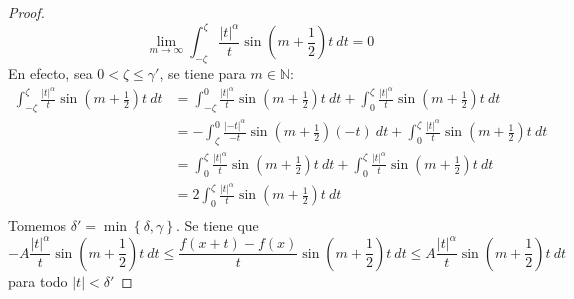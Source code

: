 \documentclass[12pt]{report}
\newcounter{it}
\theoremstyle{largebreak}
\renewcommand{\leq}{\ensuremath{\leqslant}}
\newcommand\abs[1]{\ensuremath{\left|#1\right|}}
\begin{document}
\begin{proof}
\begin{equation*}
            \lim_{ m\rightarrow\infty}\int_{-\zeta}^{\zeta}\frac{\abs{t}^\alpha}{t}\sin\left(m+\frac{1}{2}\right)t\:dt=0
        \end{equation*}
        En efecto, sea $0<\zeta\leq\gamma'$, se tiene para $m\in\mathbb{N}$:
        \begin{equation*}
            \begin{split}
                \int_{-\zeta}^{\zeta}\frac{\abs{t}^\alpha}{t}\sin\left(m+\frac{1}{2}\right)t\:dt&=\int_{-\zeta}^{0}\frac{\abs{t}^\alpha}{t}\sin\left(m+\frac{1}{2}\right)t\:dt+\int_{0}^{\zeta}\frac{\abs{t}^\alpha}{t}\sin\left(m+\frac{1}{2}\right)t\:dt\\
                &=-\int_{\zeta}^{0}\frac{\abs{-t}^\alpha}{-t}\sin\left(m+\frac{1}{2}\right)(-t)\:dt+\int_{0}^{\zeta}\frac{\abs{t}^\alpha}{t}\sin\left(m+\frac{1}{2}\right)t\:dt\\
                &=\int_{0}^{\zeta}\frac{\abs{t}^\alpha}{t}\sin\left(m+\frac{1}{2}\right)t\:dt+\int_{0}^{\zeta}\frac{\abs{t}^\alpha}{t}\sin\left(m+\frac{1}{2}\right)t\:dt\\
                &=2\int_{0}^{\zeta}\frac{\abs{t}^\alpha}{t}\sin\left(m+\frac{1}{2}\right)t\:dt\\
            \end{split}
        \end{equation*}
        Tomemos $\delta'=\min\left\{\delta,\gamma\right\}$. Se tiene que
        \begin{equation*}
            -A\frac{\abs{t}^\alpha}{t}\sin\left(m+\frac{1}{2}\right)t\:dt \leq \frac{f(x+t)-f(x)}{t}\sin\left(m+\frac{1}{2}\right)t\:dt\leq A\frac{\abs{t}^\alpha}{t}\sin\left(m+\frac{1}{2}\right)t\:dt
        \end{equation*}
        para todo $\abs{t}<\delta'$
    \end{proof}
\end{document}

